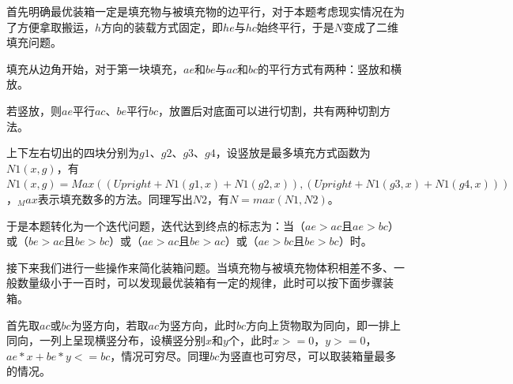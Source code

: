 \documentclass{article}
\begin{document}
	首先明确最优装箱一定是填充物与被填充物的边平行，对于本题考虑现实情况在为了方便拿取搬运，$h$方向的装载方式固定，即$he$与$hc$始终平行，于是$N$变成了二维填充问题。
	
	填充从边角开始，对于第一块填充，$ae$和$be$与$ac$和$bc$的平行方式有两种：竖放和横放。
	
	若竖放，则$ae$平行$ac$、$be$平行$bc$，放置后对底面可以进行切割，共有两种切割方法。
	\begin{figure}[!h]
		\centering 
	\end{figure}

	上下左右切出的四块分别为$g1$、$g2$、$g3$、$g4$，设竖放是最多填充方式函数为$N1(x,g)$，有$N1(x,g)=Max((Upright+N1(g1,x)+N1(g2,x)),(Upright+N1(g3,x)+N1(g4,x)))$，$_Max$表示填充数多的方法。同理写出$N2$，有$N=max(N1,N2)$。
	
	于是本题转化为一个迭代问题，迭代达到终点的标志为：当（$ae>ac$且$ae>bc$）或（$be>ac$且$be>bc$）或（$ae>ac$且$be>ac$）或（$ae>bc$且$be>bc$）时。
	
	接下来我们进行一些操作来简化装箱问题。当填充物与被填充物体积相差不多、一般数量级小于一百时，可以发现最优装箱有一定的规律，此时可以按下面步骤装箱。
	
	首先取$ac$或$bc$为竖方向，若取$ac$为竖方向，此时$bc$方向上货物取为同向，即一排上同向，一列上呈现横竖分布，设横竖分别$x$和$y$个，此时$x>=0$，$y>=0$，$ae*x+be*y<=bc$，情况可穷尽。同理$bc$为竖直也可穷尽，可以取装箱量最多的情况。
	
\end{document}
